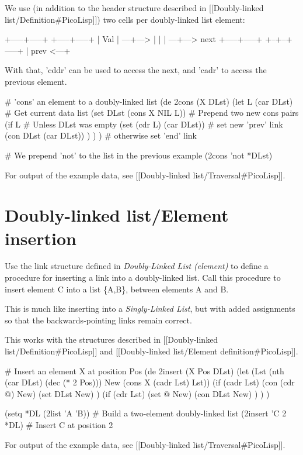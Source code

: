 \begin{wideverbatim}

We use (in addition to the header structure described in
[[Doubly-linked list/Definition#PicoLisp]])
two cells per doubly-linked list element:

         +-----+-----+     +-----+-----+
         | Val |  ---+---> |  |  |  ---+---> next
         +-----+-----+     +--+--+-----+
                              |
                     prev <---+

With that, 'cddr' can be used to access the next, and 'cadr' to access the
previous element.

# 'cons' an element to a doubly-linked list
(de 2cons (X DLst)
   (let L (car DLst)                  # Get current data list
      (set DLst (cons X NIL L))       # Prepend two new cons pairs
      (if L                           # Unless DLst was empty
         (set (cdr L) (car DLst))     # set new 'prev' link
         (con DLst (car DLst)) ) ) )  # otherwise set 'end' link

# We prepend 'not' to the list in the previous example
(2cons 'not *DLst)

For output of the example data, see [[Doubly-linked list/Traversal#PicoLisp]].

\end{wideverbatim}

\pagebreak{}
\section*{Doubly-linked list/Element insertion}

Use the link structure defined in \emph{Doubly-Linked List (element)}
to define a procedure for inserting a link into a doubly-linked list.
Call this procedure to insert element C into a list \{A,B\}, between
elements A and B.

This is much like inserting into a \emph{Singly-Linked List}, but with
added assignments so that the backwards-pointing links remain correct.


\begin{wideverbatim}

This works with the structures described in
[[Doubly-linked list/Definition#PicoLisp]] and
[[Doubly-linked list/Element definition#PicoLisp]].

# Insert an element X at position Pos
(de 2insert (X Pos DLst)
   (let (Lst (nth (car DLst) (dec (* 2 Pos)))  New (cons X (cadr Lst) Lst))
      (if (cadr Lst)
         (con (cdr @) New)
         (set DLst New) )
      (if (cdr Lst)
         (set @ New)
         (con DLst New) ) ) )

(setq *DL (2list 'A 'B))      # Build a two-element doubly-linked list
(2insert 'C 2 *DL)            # Insert C at position 2

For output of the example data, see [[Doubly-linked list/Traversal#PicoLisp]].

\end{wideverbatim}

